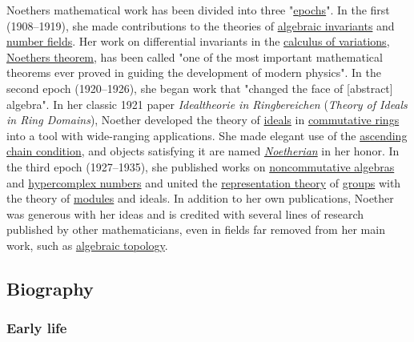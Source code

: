Noether\textquotesingle s mathematical work has been divided into three "\href{https://en.wikipedia.org/wiki/Epoch}{epochs}". In the first (1908--1919), she made contributions to the theories of \href{https://en.wikipedia.org/wiki/Algebraic_invariant}{algebraic invariants} and \href{https://en.wikipedia.org/wiki/Field_(mathematics)}{number fields}. Her work on differential invariants in the \href{https://en.wikipedia.org/wiki/Calculus_of_variations}{calculus of variations}, \href{https://en.wikipedia.org/wiki/Noether's_theorem}{Noether\textquotesingle s theorem}, has been called "one of the most important mathematical theorems ever proved in guiding the development of modern physics". In the second epoch (1920--1926), she began work that "changed the face of {[}abstract{]} algebra". In her classic 1921 paper \emph{Idealtheorie in Ringbereichen} (\emph{Theory of Ideals in Ring Domains}), Noether developed the theory of \href{https://en.wikipedia.org/wiki/Ideal_(ring_theory)}{ideals} in \href{https://en.wikipedia.org/wiki/Commutative_ring}{commutative rings} into a tool with wide-ranging applications. She made elegant use of the \href{https://en.wikipedia.org/wiki/Ascending_chain_condition}{ascending chain condition}, and objects satisfying it are named \emph{\href{https://en.wikipedia.org/wiki/Noetherian}{Noetherian}} in her honor. In the third epoch (1927--1935), she published works on \href{https://en.wikipedia.org/wiki/Noncommutative_algebra}{noncommutative algebras} and \href{https://en.wikipedia.org/wiki/Hypercomplex_number}{hypercomplex numbers} and united the \href{https://en.wikipedia.org/wiki/Representation_theory}{representation theory} of \href{https://en.wikipedia.org/wiki/Group_(mathematics)}{groups} with the theory of \href{https://en.wikipedia.org/wiki/Module_(mathematics)}{modules} and ideals. In addition to her own publications, Noether was generous with her ideas and is credited with several lines of research published by other mathematicians, even in fields far removed from her main work, such as \href{https://en.wikipedia.org/wiki/Algebraic_topology}{algebraic topology}.


\subsection{Biography}\label{Biography}


\subsubsection{Early life}\label{Early_life}

